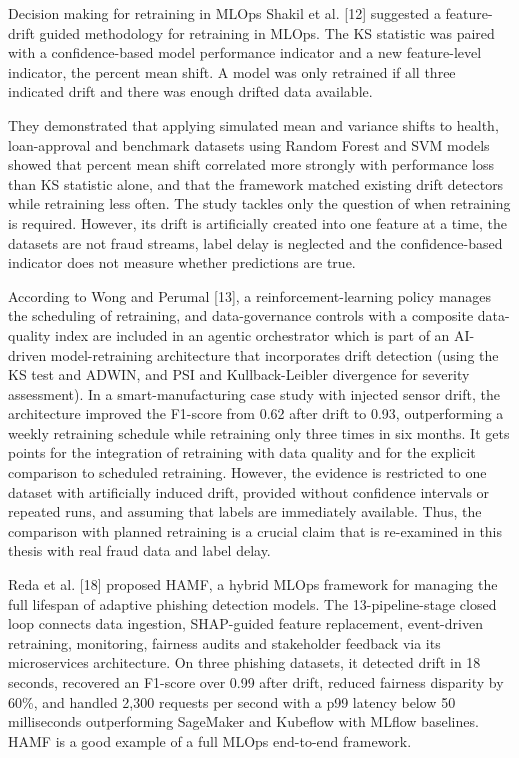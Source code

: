 \documentclass[11pt,letterpaper]{report}
\begin{document}
Decision making for retraining in MLOps Shakil et al. [12] suggested a feature-drift guided methodology for retraining in MLOps. The KS statistic was paired with a confidence-based model performance indicator and a new feature-level indicator, the percent mean shift. A model was only retrained if all three indicated drift and there was enough drifted data available.

They demonstrated that applying simulated mean and variance shifts to health, loan-approval and benchmark datasets using Random Forest and SVM models showed that percent mean shift correlated more strongly with performance loss than KS statistic alone, and that the framework matched existing drift detectors while retraining less often. The study tackles only the question of when retraining is required. However, its drift is artificially created into one feature at a time, the datasets are not fraud streams, label delay is neglected and the confidence-based indicator does not measure whether predictions are true.

According to Wong and Perumal [13], a reinforcement-learning policy manages the scheduling of retraining, and data-governance controls with a composite data-quality index are included in an agentic orchestrator which is part of an AI-driven model-retraining architecture that incorporates drift detection (using the KS test and ADWIN, and PSI and Kullback-Leibler divergence for severity assessment). In a smart-manufacturing case study with injected sensor drift, the architecture improved the F1-score from 0.62 after drift to 0.93, outperforming a weekly retraining schedule while retraining only three times in six months. It gets points for the integration of retraining with data quality and for the explicit comparison to scheduled retraining. However, the evidence is restricted to one dataset with artificially induced drift, provided without confidence intervals or repeated runs, and assuming that labels are immediately available. Thus, the comparison with planned retraining is a crucial claim that is re-examined in this thesis with real fraud data and label delay.

Reda et al. [18] proposed HAMF, a hybrid MLOps framework for managing the full lifespan of adaptive phishing detection models. The 13-pipeline-stage closed loop connects data ingestion, SHAP-guided feature replacement, event-driven retraining, monitoring, fairness audits and stakeholder feedback via its microservices architecture. On three phishing datasets, it detected drift in 18 seconds, recovered an F1-score over 0.99 after drift, reduced fairness disparity by 60\%, and handled 2,300 requests per second with a p99 latency below 50 milliseconds outperforming SageMaker and Kubeflow with MLflow baselines. HAMF is a good example of a full MLOps end-to-end framework.
\end{document}
